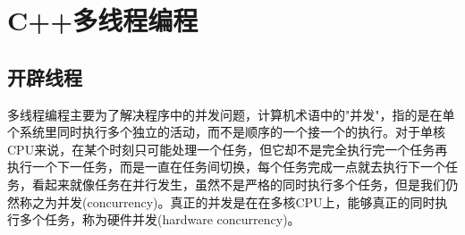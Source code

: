 \section{C++多线程编程}
\subsection{开辟线程}
多线程编程主要为了解决程序中的并发问题，计算机术语中的"并发"，指的是在单个系统里同时执行多个独立的活动，而不是顺序的一个接一个的执行。对于单核CPU来说，在某个时刻只可能处理一个任务，但它却不是完全执行完一个任务再执行一个下一任务，而是一直在任务间切换，每个任务完成一点就去执行下一个任务，看起来就像任务在并行发生，虽然不是严格的同时执行多个任务，但是我们仍然称之为并发(concurrency)。真正的并发是在在多核CPU上，能够真正的同时执行多个任务，称为硬件并发(hardware concurrency)。

